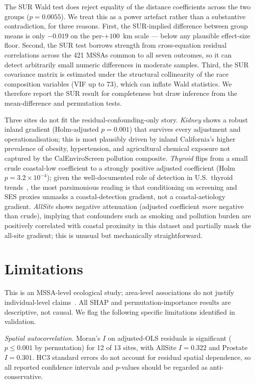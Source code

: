 \documentclass[11pt]{article}
\begin{document}
The SUR Wald test does reject equality of the distance coefficients across the two groups ($p=0.0055$). We treat this as a power artefact rather than a substantive contradiction, for three reasons. First, the SUR-implied difference between group means is only $-0.019$ on the per-$+100$~km scale --- below any plausible effect-size floor. Second, the SUR test borrows strength from cross-equation residual correlations across the 421 MSSAs common to all seven outcomes, so it can detect arbitrarily small numeric differences in moderate samples. Third, the SUR covariance matrix is estimated under the structural collinearity of the race composition variables (VIF up to 73), which can inflate Wald statistics. We therefore report the SUR result for completeness but draw inference from the mean-difference and permutation tests.

Three sites do not fit the residual-confounding-only story. \emph{Kidney} shows a robust inland gradient (Holm-adjusted $p=0.001$) that survives every adjustment and operationalisation; this is most plausibly driven by inland California's higher prevalence of obesity, hypertension, and agricultural chemical exposure not captured by the CalEnviroScreen pollution composite. \emph{Thyroid} flips from a small crude coastal-low coefficient to a strongly positive adjusted coefficient (Holm $p=3.2\times10^{-4}$); given the well-documented role of detection in U.S.\ thyroid trends~\citep{Davies2014Thyroid}, the most parsimonious reading is that conditioning on screening and SES proxies unmasks a coastal-detection gradient, not a coastal-aetiology gradient. \emph{AllSite} shows negative attenuation (adjusted coefficient \emph{more} negative than crude), implying that confounders such as smoking and pollution burden are positively correlated with coastal proximity in this dataset and partially mask the all-site gradient; this is unusual but mechanically straightforward.

\section{Limitations}
This is an MSSA-level ecological study; area-level associations do not justify individual-level claims~\citep{Morgenstern1995}. All SHAP and permutation-importance results are descriptive, not causal. We flag the following specific limitations identified in validation.

\emph{Spatial autocorrelation.} Moran's $I$ on adjusted-OLS residuals is significant ($p\le0.001$ by permutation) for 12 of 13 sites, with AllSite $I=0.322$ and Prostate $I=0.301$. HC3 standard errors do not account for residual spatial dependence, so all reported confidence intervals and $p$-values should be regarded as anti-conservative.
\end{document}
